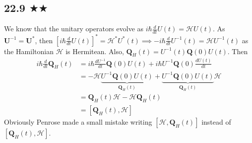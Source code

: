 \subsection{22.9 $\bigstar \bigstar$}
We know that the unitary operators evolve as $i\hbar\frac{d}{dt}U(t)=\mathcal{H} U(t)$. As $\mathbf{U}^{-1}=\mathbf{U}^*$, then $[i\hbar\frac{d}{dt}U(t)]^*=\mathcal{H}^* U^*(t)\implies -i\hbar\frac{d}{dt}U^{-1}(t)=\mathcal{H} U^{-1}(t) $ as the Hamiltonian $\mathcal{H}$ is Hermitean. Also, $\mathbf{Q}_H(t)=U^{-1}(t)\mathbf{Q}(0)U(t)$. Then
\begin{align*}
i\hbar\frac{d}{dt}\mathbf{Q}_H(t)&=i\hbar\frac{d U^{-1}}{dt}\mathbf{Q}(0)U(t)+i\hbar U^{-1}\mathbf{Q}(0)\frac{d U(t)}{dt}\\
&=-\mathcal{H}\underbrace{U^{-1}\mathbf{Q}(0)U(t)}_{\mathbf{Q}_H(t)}+\underbrace{U^{-1}\mathbf{Q}(0)U(t)}_{\mathbf{Q}_H(t)}\mathcal{H} \\
&=\mathbf{Q}_H(t)\mathcal{H}-\mathcal{H}\mathbf{Q}_H(t)\\
&=[\mathbf{Q}_H(t),\mathcal{H}] 
\end{align*}
Obviously Penrose made a small mistake writing $[\mathcal{H},\mathbf{Q}_H(t)]$ instead of $[\mathbf{Q}_H(t),\mathcal{H}]$. 



